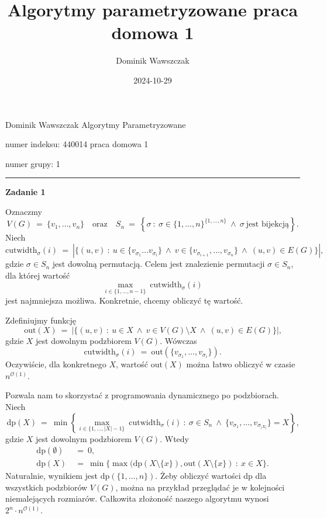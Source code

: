\documentclass[12pt]{article}
\title{Algorytmy parametryzowane praca domowa 1}
\author{Dominik Wawszczak}
\date{2024-10-29}
\begin{document}
	\setlength{\parindent}{0 cm}
	
	Dominik Wawszczak \hfill Algorytmy Parametryzowane
	
	numer indeksu: 440014 \hfill praca domowa 1
	
	numer grupy: 1
	
	\bigskip
	\hrule
	\bigskip
	
	\textbf{Zadanie 1}
	
	\medskip
	
	Oznaczmy
	\[ V(G) \ = \ \{v_{1}, \ldots, v_{n}\} \quad \text{oraz} \quad S_{n} \ = \
	\left\{ \sigma \ : \ \sigma \in \{1, \ldots, n\}^{\{1, \ldots, n\}} \ \wedge
	\ \sigma \ \text{jest bijekcją} \right\} \text{.} \]
	Niech
	\[ \text{cutwidth}_{\sigma}(i) \ = \ |\{(u, v) \ : \ u \in \{v_{\sigma_{1}}
	\ldots v_{\sigma_{i}}\} \ \wedge \ v \in \{v_{\sigma_{i + 1}}, \ldots,
	v_{\sigma_{n}}\} \ \wedge \ (u, v) \in E(G)\}| \text{,} \]
	gdzie \(\sigma \in S_{n}\) jest dowolną permutacją. Celem jest znalezienie
	permutacji \(\sigma \in S_{n}\), dla której wartość
	\[ \underset{i \in \{1, \ldots, n - 1\}}{\max} \
	\text{cutwidth}_{\sigma}(i) \]
	jest najmniejsza możliwa. Konkretnie, chcemy obliczyć tę wartość.
	
	\medskip
	
	Zdefiniujmy funkcję
	\[ \text{out}(X) \ = \ |\{(u, v) \ : \ u \in X \ \wedge \ v \in V(G)
	\setminus X \ \wedge \ (u, v) \in E(G)\}| \text{,} \]
	gdzie \(X\) jest dowolnym podzbiorem \(V(G)\). Wówczas
	\[ \text{cutwidth}_{\sigma}(i) \ = \ \text{out}(\{v_{\sigma_{1}}, \ldots,
	v_{\sigma_{i}}\}) \text{.} \]
	Oczywiście, dla konkretnego \(X\), wartość \(\text{out}(X)\) można łatwo
	obliczyć w czasie \(n^{\mathcal{O}(1)}\).
	
	\medskip
	
	Pozwala nam to skorzystać z programowania dynamicznego po podzbiorach. Niech
	\[ \text{dp}(X) \ = \ \min \left\{ \underset{i \in
	\{1, \ldots, |X| - 1\}}{\max} \ \text{cutwidth}_{\sigma}(i) \ : \ \sigma \in
	S_{n} \ \wedge \ \{v_{\sigma_{1}}, \ldots, v_{\sigma_{|X|}}\} = X \right\}
	\text{,} \]
	gdzie \(X\) jest dowolnym podzbiorem \(V(G)\). Wtedy
	\begin{align*}
		\text{dp}(\emptyset) \ &= \ 0 \text{,} \\
		\text{dp}(X) \ &= \ \min \{\max(\text{dp}(X \setminus \{x\}),
		\text{out}(X \setminus \{x\}) \ : \ x \in X\} \text{.}
	\end{align*}
	Naturalnie, wynikiem jest \(\text{dp}(\{1, \ldots, n\})\). Żeby obliczyć
	wartości \(\text{dp}\) dla wszystkich podzbiorów \(V(G)\), można na przykład
	przeglądać je w kolejności niemalejących rozmiarów. Całkowita złożoność
	naszego algorytmu wynosi \(2^{n} \cdot n^{\mathcal{O}(1)}\).
	
\end{document}
